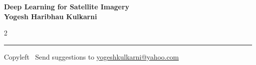 \documentclass[8pt,landscape]{article}
\begin{document}
\footnotesize


\begin{center}
\Large{\textbf{Deep Learning for Satellite Imagery\\ Yogesh Haribhau Kulkarni}}  
\end{center}

\begin{multicols}{2}

\end{multicols}

\rule{\linewidth}{0.25pt}
\scriptsize
Copyleft \textcopyleft\  Send suggestions to 
\href{http://www.yogeshkulkarni.com}{yogeshkulkarni@yahoo.com}
\end{document}
